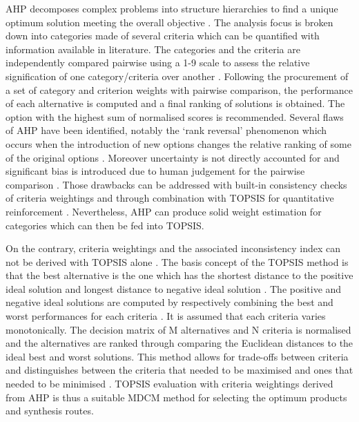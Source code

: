 AHP decomposes complex problems into structure hierarchies to find a unique optimum solution meeting the overall objective \cite{mu_practical_2017}. The analysis focus is broken down into categories made of several criteria which can be quantified with information available in literature. The categories and the criteria are independently compared pairwise using a 1-9 scale to assess the relative signification of one category/criteria over another \cite{saaty_analytic_1987}. Following the procurement of a set of category and criterion weights with pairwise comparison, the performance of each alternative is computed and a final ranking of solutions is obtained. The option with the highest sum of normalised scores is recommended. Several flaws of AHP have been identified, notably the ‘rank reversal’ phenomenon which occurs when the introduction of new options changes the relative ranking of some of the original options \cite{great_britain_multi-criteria_2009}. Moreover uncertainty is not directly accounted for and significant bias is introduced due to human judgement for the pairwise comparison \cite{millet_modelling_2002}. Those drawbacks can be addressed with built-in consistency checks of criteria weightings and through combination with TOPSIS for quantitative reinforcement \cite{tzeng_multi-criteria_2005}. Nevertheless, AHP can produce solid weight estimation for categories which can then be fed into TOPSIS. 

On the contrary, criteria weightings and the associated inconsistency index can not be derived with TOPSIS alone \cite{roszkowska_multi-criteria_2011}. The basis concept of the TOPSIS method is that the best alternative is the one which has the shortest distance to the positive ideal solution and longest distance to negative ideal solution \cite{pohekar_application_2004}. The positive and negative ideal solutions are computed by respectively combining the best and worst performances for each criteria \cite{olson_comparison_2004}. It is assumed that each criteria varies monotonically. The decision matrix of M alternatives and N criteria is normalised and the alternatives are ranked through comparing the Euclidean distances to the ideal best and worst solutions. This method allows for trade-offs between criteria and distinguishes between the criteria that needed to be maximised and ones that needed to be minimised \cite{pirdashti_multi-criteria_2009}. TOPSIS evaluation with criteria weightings derived from AHP is thus a suitable MDCM method for selecting the optimum products and synthesis routes.


